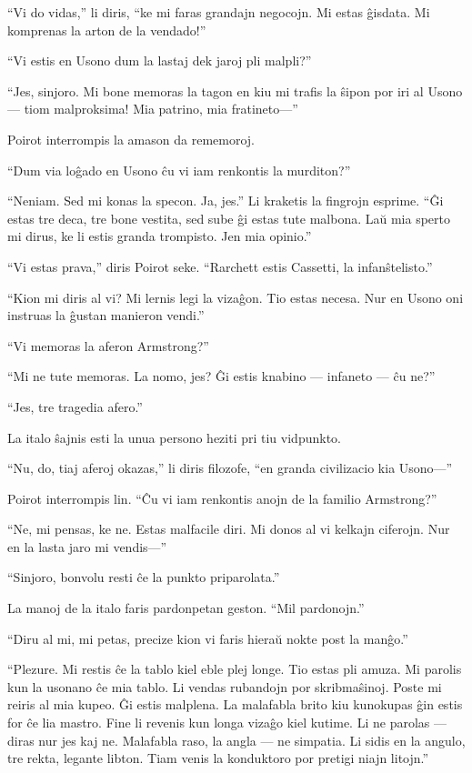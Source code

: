 ``Vi do vidas,'' li diris, ``ke mi faras grandajn negocojn. Mi estas ĝisdata. Mi komprenas la arton de la vendado!''

``Vi estis en Usono dum la lastaj dek jaroj pli malpli?''

``Jes, sinjoro. Mi bone memoras la tagon en kiu mi trafis la ŝipon por iri al Usono --- tiom malproksima! Mia patrino, mia fratineto---''

Poirot interrompis la amason da rememoroj.

``Dum via loĝado en Usono ĉu vi iam renkontis la murditon?''

``Neniam. Sed mi konas la specon. Ja, jes.'' Li kraketis la fingrojn esprime. ``Ĝi estas tre deca, tre bone vestita, sed sube ĝi estas tute malbona. Laŭ mia sperto mi dirus, ke li estis granda trompisto. Jen mia opinio.''

``Vi estas prava,'' diris Poirot seke. ``Rarchett estis Cassetti, la infanŝtelisto.''

``Kion mi diris al vi? Mi lernis legi la vizaĝon. Tio estas necesa. Nur en Usono oni instruas la ĝustan manieron vendi.''

``Vi memoras la aferon Armstrong?''

``Mi ne tute memoras. La nomo, jes? Ĝi estis knabino --- infaneto --- ĉu ne?''

``Jes, tre tragedia afero.''

La italo ŝajnis esti la unua persono heziti pri tiu vidpunkto.

``Nu, do, tiaj aferoj okazas,'' li diris filozofe, ``en granda civilizacio kia Usono---''

Poirot interrompis lin. ``Ĉu vi iam renkontis anojn de la familio Armstrong?''

``Ne, mi pensas, ke ne. Estas malfacile diri. Mi donos al vi kelkajn ciferojn. Nur en la lasta jaro mi vendis---''

``Sinjoro, bonvolu resti ĉe la punkto priparolata.''

La manoj de la italo faris pardonpetan geston. ``Mil pardonojn.''

``Diru al mi, mi petas, precize kion vi faris hieraŭ nokte post la manĝo.''

``Plezure. Mi restis ĉe la tablo kiel eble plej longe. Tio estas pli amuza. Mi parolis kun la usonano ĉe mia tablo. Li vendas rubandojn por skribmaŝinoj. Poste mi reiris al mia kupeo. Ĝi estis malplena. La malafabla brito kiu kunokupas ĝin estis for ĉe lia mastro. Fine li revenis kun longa vizaĝo kiel kutime. Li ne parolas --- diras nur jes kaj ne. Malafabla raso, la angla --- ne simpatia. Li sidis en la angulo, tre rekta, legante libton. Tiam venis la konduktoro por pretigi niajn litojn.''

